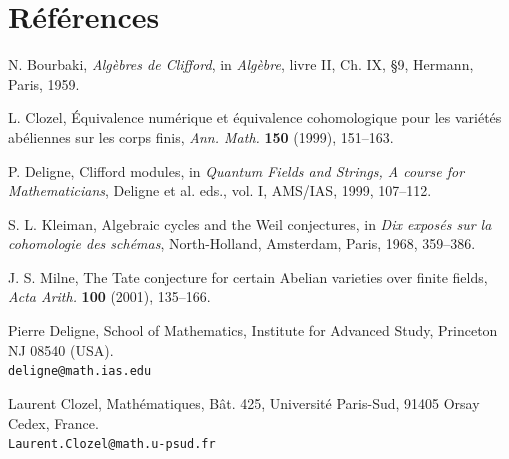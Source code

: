 \documentclass[11pt]{article}
\theoremstyle{deligne}
\begin{document}
\section*{Références}
\begin{enumerate}[label={[\arabic*]}]
\item N. Bourbaki, \emph{Algèbres de Clifford}, in \emph{Algèbre}, livre II, Ch. IX, \S9, Hermann, Paris, 1959.
\item L. Clozel, Équivalence numérique et équivalence cohomologique pour les variétés abéliennes sur les corps finis, \emph{Ann. Math.} \textbf{150} (1999), 151--163.
\item P. Deligne, Clifford modules, in \emph{Quantum Fields and Strings, A course for Mathematicians}, Deligne et al. eds., vol. I, AMS/IAS, 1999, 107--112.
\item S. L. Kleiman, Algebraic cycles and the Weil conjectures, in \emph{Dix exposés sur la cohomologie des schémas}, North-Holland, Amsterdam, Paris, 1968, 359--386.
\item J. S. Milne, The Tate conjecture for certain Abelian varieties over finite fields, \emph{Acta Arith.} \textbf{100} (2001), 135--166.
\end{enumerate}

Pierre Deligne, School of Mathematics, Institute for Advanced Study, Princeton NJ 08540 (USA).\\
\texttt{deligne@math.ias.edu}

Laurent Clozel, Mathématiques, Bât. 425, Université Paris-Sud, 91405 Orsay Cedex, France.\\
\texttt{Laurent.Clozel@math.u-psud.fr}
\end{document}
